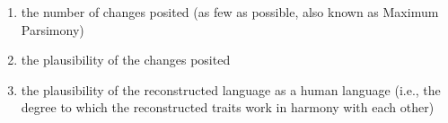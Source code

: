 \documentclass[12pt,letterpaper]{article}
\begin{document}
\begin{enumerate}[label=(\roman*)]
\item the number of changes posited (as few as possible, also known as Maximum Parsimony)
\item the plausibility of the changes posited
\item the plausibility of the reconstructed language as a human language (i.e., the degree to which the reconstructed traits work in harmony with each other)
\end{enumerate}



\end{document}
